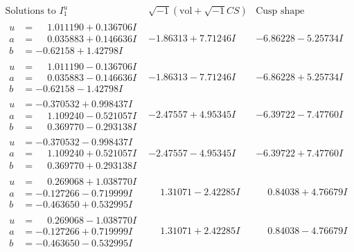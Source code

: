 \documentclass[1p]{elsarticle_modified}
\theoremstyle{definition}
\newcommand{\I}{\sqrt{-1}}
\begin{document}
$$\begin{array}{c|c|c}  
\text{Solutions to }I^u_{1}& \I (\text{vol} + \sqrt{-1}CS) & \text{Cusp shape}\\
 \hline 
\begin{aligned}
u &= \phantom{-}1.011190 + 0.136706 I \\
a &= \phantom{-}0.035883 + 0.146636 I \\
b &= -0.62158 + 1.42798 I\end{aligned}
 & -1.86313 + 7.71246 I & -6.86228 - 5.25734 I \\ \hline\begin{aligned}
u &= \phantom{-}1.011190 - 0.136706 I \\
a &= \phantom{-}0.035883 - 0.146636 I \\
b &= -0.62158 - 1.42798 I\end{aligned}
 & -1.86313 - 7.71246 I & -6.86228 + 5.25734 I \\ \hline\begin{aligned}
u &= -0.370532 + 0.998437 I \\
a &= \phantom{-}1.109240 - 0.521057 I \\
b &= \phantom{-}0.369770 - 0.293138 I\end{aligned}
 & -2.47557 + 4.95345 I & -6.39722 - 7.47760 I \\ \hline\begin{aligned}
u &= -0.370532 - 0.998437 I \\
a &= \phantom{-}1.109240 + 0.521057 I \\
b &= \phantom{-}0.369770 + 0.293138 I\end{aligned}
 & -2.47557 - 4.95345 I & -6.39722 + 7.47760 I \\ \hline\begin{aligned}
u &= \phantom{-}0.269068 + 1.038770 I \\
a &= -0.127266 - 0.719999 I \\
b &= -0.463650 + 0.532995 I\end{aligned}
 & \phantom{-}1.31071 - 2.42285 I & \phantom{-}0.84038 + 4.76679 I \\ \hline\begin{aligned}
u &= \phantom{-}0.269068 - 1.038770 I \\
a &= -0.127266 + 0.719999 I \\
b &= -0.463650 - 0.532995 I\end{aligned}
 & \phantom{-}1.31071 + 2.42285 I & \phantom{-}0.84038 - 4.76679 I \\ \hline\begin{aligned}

\end{aligned}
\end{array}$$
\end{document}
